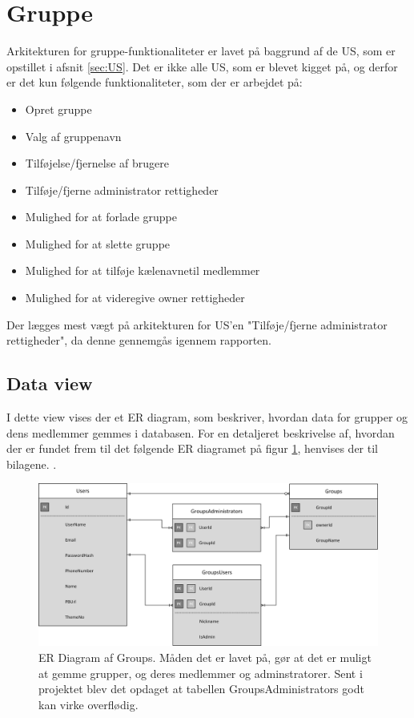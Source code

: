 \section{Gruppe} \label{sec:arch_group}
Arkitekturen for gruppe-funktionaliteter er lavet på baggrund af de US, som er opstillet i afsnit \ref{sec:US}. Det er ikke alle US, som er blevet kigget på, og derfor er det kun følgende funktionaliteter, som der er arbejdet på:
\begin{itemize}
    \item Opret gruppe    
    \item Valg af gruppenavn
    \item Tilføjelse/fjernelse af brugere
    \item Tilføje/fjerne administrator rettigheder
    \item Mulighed for at forlade gruppe
    \item Mulighed for at slette gruppe
    \item Mulighed for at tilføje kælenavnetil medlemmer
    \item Mulighed for at videregive owner rettigheder
\end{itemize}

\noindent Der lægges mest vægt på arkitekturen for US’en "Tilføje/fjerne administrator rettigheder", da denne gennemgås igennem rapporten. \\

\subsection{Data view}
I dette view vises der et ER diagram, som beskriver, hvordan data for grupper og dens medlemmer gemmes i databasen. For en detaljeret beskrivelse af, hvordan der er fundet frem til det følgende ER diagramet på figur \ref{fig:group_ER}, henvises der til bilagene. .
\begin{figure}[H]
  \includegraphics[width=\linewidth]{01_Billeder/09_Arkitektur/Group/Data_Group.png}
  \centering
  \caption{ER Diagram af Groups. Måden det er lavet på, gør at det er muligt at gemme grupper, og deres medlemmer og adminstratorer. Sent i projektet blev det opdaget at tabellen GroupsAdministrators godt kan virke overflødig.}
  \label{fig:group_ER}
\end{figure}

